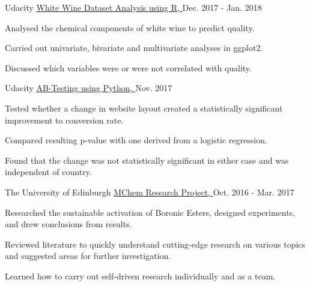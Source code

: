 

\begin{cventries}


  \cventry
    {Udacity} %
    {\href{https://github.com/SThornewillvE/Udacity-Project---Exploring-Wine-Data}{White Wine Dataset Analysis using R, }} %
    {} %
    {Dec. 2017 - Jan. 2018} %
    {
    \begin{cvitems} %
      \item {Analysed the chemical components of white wine to predict quality.}
      \item {Carried out univariate, bivariate and multivariate analyses in ggplot2.}
      \item {Discussed which variables were or were not correlated with quality.}
    \end{cvitems}
    }

  \cventry
    {Udacity} %
    {\href{https://github.com/SThornewillvE/Udacity-Project---AB-testing}{AB-Testing using Python, }} %
    {} %
    {Nov. 2017} %
    {
    \begin{cvitems} %
      \item {Tested whether a change in website layout created a statistically significant improvement to conversion rate.}
      \item {Compared resulting p-value with one derived from a logistic regression.}
      \item {Found that the change was not statistically significant in either case and was independent of country.}
    \end{cvitems}
    }

  \cventry
    {The University of Edinburgh} %
    {\href{https://www.evernote.com/shard/s234/sh/559f3e12-1aa6-4d68-a68b-3ddaf8526b9c/ccfcc1f7a32c8966587de6b8983877cb}{MChem Research Project, }} %
    {} %
    {Oct. 2016 - Mar. 2017} %
    {
    \begin{cvitems} %
      \item {Researched the sustainable activation of Boronic Esters, designed experiments, and drew conclusions from results.}
      \item {Reviewed literature to quickly understand cutting-edge research on various topics and suggested areas for further investigation.}
      \item{Learned how to carry out self-driven research individually and as a team.}
    \end{cvitems}
    }

\end{cventries}
